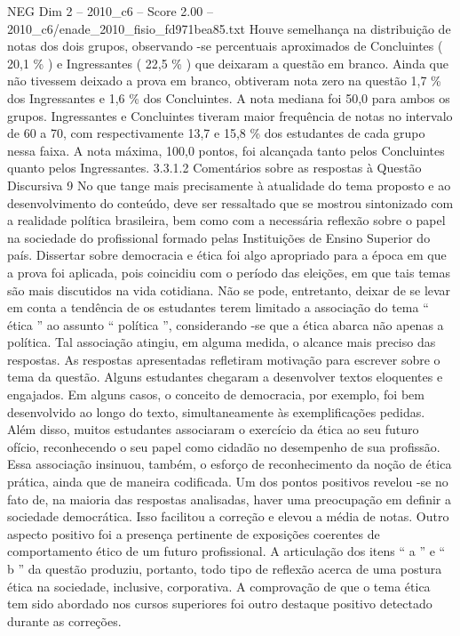 \begin{textsample}{NEG Dim 2 – 2010\_c6 – Score 2.00 – 2010\_c6/enade\_2010\_fisio\_fd971bea85.txt}
Houve semelhança na distribuição de notas dos dois grupos, observando -se percentuais aproximados de Concluintes ( 20,1 \% ) e Ingressantes ( 22,5 \% ) que deixaram a questão em branco.
Ainda que não tivessem deixado a prova em branco, obtiveram nota zero na questão 1,7 \% dos Ingressantes e 1,6 \% dos Concluintes.
A nota mediana foi 50,0 para ambos os grupos.
Ingressantes e Concluintes tiveram maior frequência de notas no intervalo de 60 a 70, com respectivamente 13,7 e 15,8 \% dos estudantes de cada grupo nessa faixa.
A nota máxima, 100,0 pontos, foi alcançada tanto pelos Concluintes quanto pelos Ingressantes. 3.3.1.2 Comentários sobre as respostas à Questão Discursiva 9 No que tange mais precisamente à atualidade do tema proposto e ao desenvolvimento do conteúdo, deve ser ressaltado que se mostrou sintonizado com a realidade política brasileira, bem como com a necessária reflexão sobre o papel na sociedade do profissional formado pelas Instituições de Ensino Superior do país.
Dissertar sobre democracia e ética foi algo apropriado para a época em que a prova foi aplicada, pois coincidiu com o período das eleições, em que tais temas são mais discutidos na vida cotidiana.
Não se pode, entretanto, deixar de se levar em conta a tendência de os estudantes terem limitado a associação do tema “ ética ” ao assunto “ política ”, considerando -se que a ética abarca não apenas a política.
Tal associação atingiu, em alguma medida, o alcance mais preciso das respostas.
As respostas apresentadas refletiram motivação para escrever sobre o tema da questão.
Alguns estudantes chegaram a desenvolver textos eloquentes e engajados.
Em alguns casos, o conceito de democracia, por exemplo, foi bem desenvolvido ao longo do texto, simultaneamente às exemplificações pedidas.
Além disso, muitos estudantes associaram o exercício da ética ao seu futuro ofício, reconhecendo o seu papel como cidadão no desempenho de sua profissão.
Essa associação insinuou, também, o esforço de reconhecimento da noção de ética prática, ainda que de maneira codificada.
Um dos pontos positivos revelou -se no fato de, na maioria das respostas analisadas, haver uma preocupação em definir a sociedade democrática.
Isso facilitou a correção e elevou a média de notas.
Outro aspecto positivo foi a presença pertinente de exposições coerentes de comportamento ético de um futuro profissional.
A articulação dos itens “ a ” e “ b ” da questão produziu, portanto, todo tipo de reflexão acerca de uma postura ética na sociedade, inclusive, corporativa.
A comprovação de que o tema ética tem sido abordado nos cursos superiores foi outro destaque positivo detectado durante as correções.

\end{textsample}
